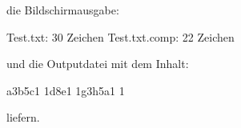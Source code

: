 die Bildschirmausgabe:

\begin{osuefmtcode}
      Test.txt:        30 Zeichen
      Test.txt.comp:   22 Zeichen
\end{osuefmtcode}

und die Outputdatei  mit dem Inhalt:

\begin{osuefmtcode}
      a3b5c1
      1d8e1
      1g3h5a1
      1
\end{osuefmtcode}

liefern.

\osueguidelinesone



